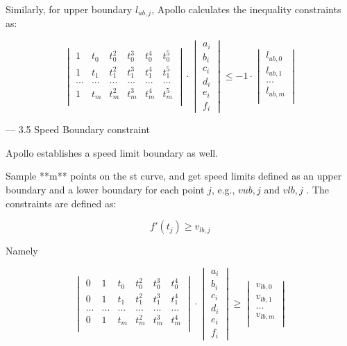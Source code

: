 \documentclass[a4paper,11pt]{article}  %
\begin{document}
Similarly, for upper boundary $l_{ub,j}$, Apollo calculates the inequality constraints as: 

$$
\begin{vmatrix} 
 1 & t_0 & t_0^2 & t_0^3 & t_0^4&t_0^5 \\
  1 & t_1 & t_1^2 & t_1^3 & t_1^4&t_1^5 \\
 ...&...&...&...&...&... \\
 1 & t_m & t_m^2 & t_m^3 & t_m^4&t_m^5 \\
 \end{vmatrix} \cdot \begin{vmatrix} a_i \\ b_i \\ c_i \\ d_i \\ e_i \\ f_i \end{vmatrix} 
 \leq
 -1 \cdot
 \begin{vmatrix}
 l_{ub,0}\\
 l_{ub,1}\\
 ...\\
 l_{ub,m}\\
 \end{vmatrix}
$$




--- 3.5  Speed Boundary constraint

Apollo establishes a speed limit boundary as well.

Sample **m** points on the st curve, and get speed limits defined as an upper boundary and a lower boundary for each point $j$, e.g., $v{ub,j}$ and $v{lb,j}$ . The constraints are defined as: 

$$
f'(t_j) \geq v_{lb,j}
$$

Namely

$$
\begin{vmatrix}  
0& 1 & t_0 & t_0^2 & t_0^3 & t_0^4 \\  
0 & 1 & t_1 & t_1^2 & t_1^3 & t_1^4 \\ 
...&...&...&...&...&... \\ 
0& 1 & t_m & t_m^2 & t_m^3 & t_m^4 \\ 
\end{vmatrix} 
\cdot 
\begin{vmatrix} 
a_i \\ b_i \\ c_i \\ d_i \\ e_i \\ f_i 
\end{vmatrix}  
\geq  
\begin{vmatrix} v_{lb,0}\\ v_{lb,1}\\ ...\\ v_{lb,m}\\ \end{vmatrix}
$$
\end{document}
